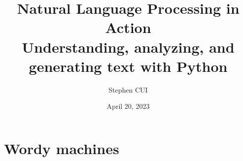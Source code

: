 \documentclass[openany]{book}
\title{\textbf{Natural Language Processing in Action}\\
Understanding, analyzing, and generating text with Python
}
\author{Stephen CUI}
\date{April 20, 2023}
\begin{document}
\maketitle
\part{Wordy machines}

\end{document}
